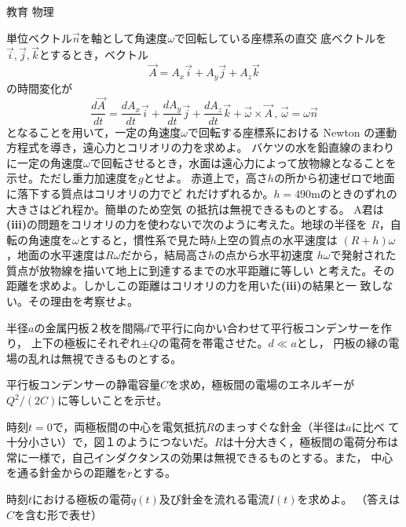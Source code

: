 \documentclass[fleqn]{jbook}
\begin{document}
\begin{question}{教育 物理}{}


\begin{subquestions}
\SubQuestion
\begin{subsubquestions}
\SubSubQuestion
単位ベクトル$\vec{n}$を軸として角速度$\omega$で回転している座標系の直交
底ベクトルを$\vec{i},\vec{j},\vec{k}$とするとき，ベクトル
\[ \vec{A}=A_x\vec{i}+A_y\vec{j}+A_z\vec{k} \]
の時間変化が
\[\frac{d\vec{A}}{dt}=\frac{dA_x}{dt}\vec{i}+\frac{dA_y}{dt}\vec{j}
+\frac{dA_z}{dt}\vec{k}+\vec{\omega}\times \vec{A} \, ,\, \vec{\omega}
=\omega\vec{n} \]
となることを用いて，一定の角速度$\omega$で回転する座標系における Newton の運動方程式を導き，遠心力とコリオリの力を求めよ。
\SubSubQuestion 
バケツの水を鉛直線のまわりに一定の角速度$\omega$で回転させるとき，水面は遠心力によって放物線となることを示せ。ただし重力加速度を$g$とせよ。 
\SubSubQuestion
 赤道上で，高さ$h$の所から初速ゼロで地面に落下する質点はコリオリの力でど
れだけずれるか。$h=490$mのときのずれの大きさはどれ程か。簡単のため空気
の抵抗は無視できるものとする。
\SubSubQuestion
 A君は{\bf{(iii)}}の問題をコリオリの力を使わないで次のように考えた。地球の半径を
$R$，自転の角速度を$\omega$とすると，慣性系で見た時$h$上空の質点の水平速度は
$(R+h)\omega$，地面の水平速度は$R\omega$だから，結局高さ$h$の点から水平初速度
$h\omega$で発射された質点が放物線を描いて地上に到達するまでの水平距離に等しい
と考えた。その距離を求めよ。しかしこの距離はコリオリの力を用いた{\bf(iii)}の結果と一
致しない。その理由を考察せよ。
\end{subsubquestions}





\SubQuestion
半径$a$の金属円板２枚を間隔$d$で平行に向かい合わせて平行板コンデンサーを作り，
上下の極板にそれぞれ$\pm Q$の電荷を帯電させた。$d\ll a$とし，
円板の縁の電場の乱れは無視できるものとする。

\begin{subsubquestions}
\SubSubQuestion
平行板コンデンサーの静電容量$C$を求め，極板間の電場のエネルギーが
$Q^2/(2C)$に等しいことを示せ。


時刻$t=0$で，両極板間の中心を電気抵抗$R$のまっすぐな針金（半径は$a$に比べ
て十分小さい）で，図１のようにつないだ。$R$は十分大きく，極板間の電荷分布は
常に一様で，自己インダクタンスの効果は無視できるものとする。また，
中心を通る針金からの距離を$r$とする。

\parbox[t]{100mm}{
\SubSubQuestion
 時刻$t$における極板の電荷$q(t)$及び針金を流れる電流$I(t)$を求めよ。
（答えは$C$を含む形で表せ）

}
\end{subsubquestions}
\end{subquestions}
\end{question}
\end{document}
